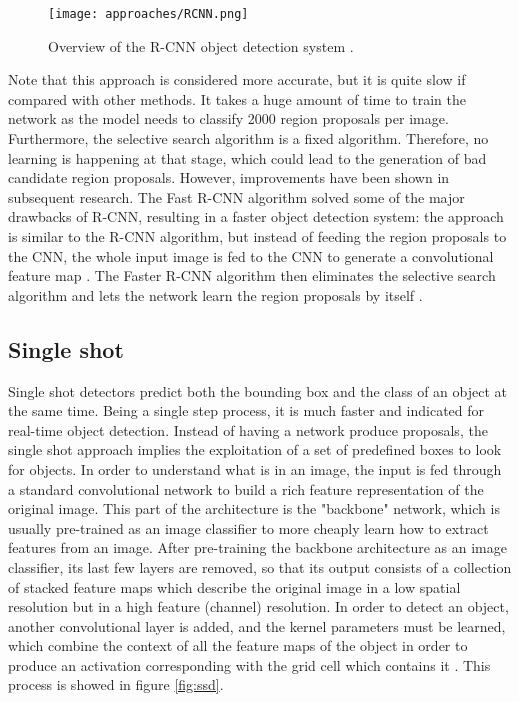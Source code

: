 \begin{figure}[h]
	\caption{Overview of the R-CNN object detection system \cite{Gandhi2018}.}
	\centering
	\texttt{[image: approaches/RCNN.png]}
	\label{fig:rcnn}
\end{figure}

Note that this approach is considered more accurate, but it is quite slow if compared with other methods. It takes a huge amount of time to train the network as the model needs to classify 2000 region proposals per image. Furthermore, the selective search algorithm is a fixed algorithm. Therefore, no learning is happening at that stage, which could lead to the generation of bad candidate region proposals. However, improvements have been shown in subsequent research. The Fast R-CNN algorithm solved some of the major drawbacks of R-CNN, resulting in a faster object detection system: the approach is similar to the R-CNN algorithm, but instead of feeding the region proposals to the CNN, the whole input image is fed to the CNN to generate a convolutional feature map \cite{Girshick2015-ay}. The Faster R-CNN algorithm then eliminates the selective search algorithm and lets the network learn the region proposals by itself \cite{Ren2017-fu}.

\subsection{Single shot}
\label{ssec:singleshot}

Single shot detectors predict both the bounding box and the class of an object at the same time. Being a single step process, it is much faster and indicated for real-time object detection. Instead of having a network produce proposals, the single shot approach implies the exploitation of a set of predefined boxes to look for objects. In order to understand what is in an image, the input is fed through a standard convolutional network to build a rich feature representation of the original image. This part of the architecture is the "backbone" network, which is usually pre-trained as an image classifier to more cheaply learn how to extract features from an image. After pre-training the backbone architecture as an image classifier, its last few layers are removed, so that its output consists of a collection of stacked feature maps which describe the original image in a low spatial resolution but in a high feature (channel) resolution. In order to detect an object, another convolutional layer is added, and the kernel parameters must be learned, which combine the context of all the feature maps of the object in order to produce an activation corresponding with the grid cell which contains it \cite{Jordan2018}. This process is showed in figure \ref{fig:ssd}. \\

